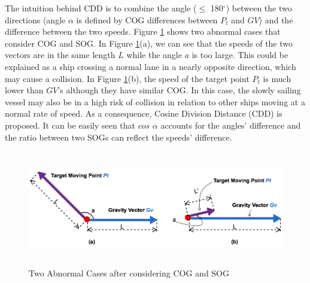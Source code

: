 \documentclass[12pt,glossary]{dalcsthesis}
\begin{document}




The intuition behind CDD is to combine the angle ($\leq$ 180$^\circ$) between the two directions (angle $\alpha$ is defined by COG differences between $P_t$ and $GV$) and the difference between the two speeds. Figure \ref{fig:abnormal_cogsog} shows two abnormal cases that consider COG and SOG. In Figure \ref{fig:abnormal_cogsog}(a), we can see that the speeds of the two vectors are in the same length $L$ while the angle $a$ is too large. This could be explained as a ship crossing a normal lane in a nearly opposite direction, which may cause a collision. In Figure \ref{fig:abnormal_cogsog}(b), the speed of the target point $P_t$ is much lower than $GV$'s although they have similar COG. In this case, the slowly sailing vessel may also be in a high risk of collision in relation to other ships moving at a normal rate of speed. As a consequence, Cosine Division Distance (CDD) is proposed. It can be easily seen that $cos$ $\alpha$ accounts for the angles' difference and the ratio between two SOGs can reflect the speeds' difference. 

\begin{figure}[!htb]
\centering
\includegraphics[width=14cm,height=5cm]{abnormalSpeedDirection.png}
\caption{Two Abnormal Cases after considering COG and SOG}
\label{fig:abnormal_cogsog}
\end{figure}
\end{document}
